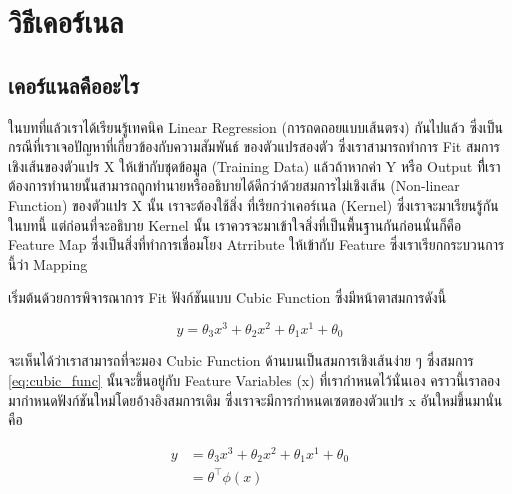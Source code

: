 

\chapter{วิธีเคอร์เนล}
\label{ch:kernel}

\section{เคอร์แนลคืออะไร}

ในบทที่แล้วเราได้เรียนรู้เทคนิค Linear Regression (การถดถอยแบบเส้นตรง) กันไปแล้ว ซึ่งเป็นกรณีที่เราเจอปัญหาที่เกี่ยวข้องกับความสัมพันธ์%
ของตัวแปรสองตัว ซึ่งเราสามารถทำการ Fit สมการเชิงเส้นของตัวแปร X ให้เข้ากับชุดข้อมูล (Training Data) แล้วถ้าหากค่า Y หรือ Output 
ทีี่เราต้องการทำนายนั้นสามารถถูกทำนายหรืออธิบายได้ดีกว่าด้วยสมการไม่เชิงเส้น (Non-linear Function) ของตัวแปร X นั้น เราจะต้องใช้สิ่ง%
ที่เรียกว่าเคอร์เนล (Kernel) ซึ่งเราจะมาเรียนรู้กันในบทนี้ แต่ก่อนที่จะอธิบาย Kernel นั้น เราควรจะมาเข้าใจสิ่งที่เป็นพื้นฐานกันก่อนนั่นก็คือ Feature Map ซึ่งเป็นสิ่งที่ทำการเชื่อมโยง Atrribute ให้เข้ากับ 
Feature ซึ่งเราเรียกกระบวนการนี้ว่า Mapping 

เริ่มต้นด้วยการพิจารณาการ Fit ฟังก์ชันแบบ Cubic Function ซึ่งมีหน้าตาสมการดังนี้

\begin{equation}\label{eq:cubic_func}
    y = \theta_{3}x^{3} + \theta_{2}x^{2} + \theta_{1}x^{1} + \theta_{0}
\end{equation}

จะเห็นได้ว่าเราสามารถที่จะมอง Cubic Function ด้านบนเป็นสมการเชิงเส้นง่าย ๆ ซึ่งสมการ \ref{eq:cubic_func} นั้นจะขึ้นอยู่กับ Feature 
Variables (x) ที่เรากำหนดไว้นั่นเอง คราวนี้เราลองมากำหนดฟังก์ชันใหม่โดยอ้างอิงสมการเดิม ซึ่งเราจะมีการกำหนดเซตของตัวแปร x อันใหม่ขึ้นมานั่นคือ

\begin{align}\label{eq:cubic_func_2}
    y &= \theta_{3}x^{3} + \theta_{2}x^{2} + \theta_{1}x^{1} + \theta_{0} \nonumber \\ 
      &= \theta^{\top}\phi(x)
\end{align}

